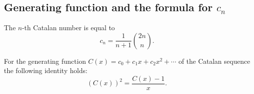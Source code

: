 \begin{page}
\setcounter{section}{4}
\setcounter{subsection}{2}
\setcounter{dfn}{2}
\label{portion:863}

\subsection{Generating function and the formula for $c_n$}
\label{sec:GenFuncCatalan}

\end{page}

\begin{page}
\setcounter{section}{4}
\setcounter{subsection}{2}
\setcounter{dfn}{3}
\label{portion:865}

\begin{thm}
\label{thm:CatalanFormula}
The $n$-th Catalan number is equal to
\begin{equation}
\label{eqn:CatalanFormula}
c_n = \frac1{n+1} \binom{2n}{n}.
\end{equation}
\end{thm}

\end{page}

\begin{page}
\setcounter{section}{4}
\setcounter{subsection}{2}
\setcounter{dfn}{4}
\label{portion:868}

\begin{lem}
\label{lem:CatalanGenFunc}
For the generating function $C(x) = c_0 + c_1 x + c_2 x^2 + \cdots$ of the Catalan sequence
the following identity holds:
\[
(C(x))^2 = \frac{C(x) - 1}{x}.
\]
\end{lem}

\end{page}

